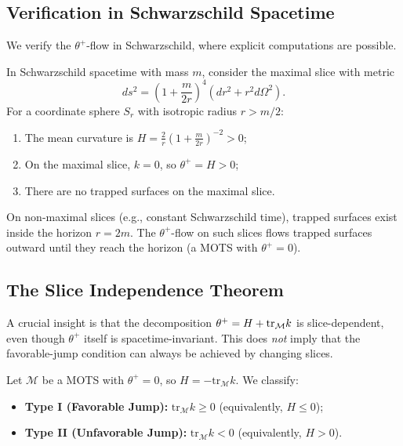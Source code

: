\subsection{Verification in Schwarzschild Spacetime}
\label{subsec:schwarzschild-verification}

We verify the $\theta^+$-flow in Schwarzschild, where explicit computations are possible.

\begin{proposition}
\label{prop:schwarzschild-flow}
In Schwarzschild spacetime with mass $m$, consider the maximal slice with metric
\begin{equation}
ds^2 = \left(1 + \frac{m}{2r}\right)^4 (dr^2 + r^2 d\Omega^2).
\end{equation}
For a coordinate sphere $S_r$ with isotropic radius $r > m/2$:
\begin{enumerate}
\item The mean curvature is $H = \frac{2}{r}\left(1 + \frac{m}{2r}\right)^{-2} > 0$;
\item On the maximal slice, $k = 0$, so $\theta^+ = H > 0$;
\item There are no trapped surfaces on the maximal slice.
\end{enumerate}
\end{proposition}

\begin{remark}
On non-maximal slices (e.g., constant Schwarzschild time), trapped surfaces exist inside the horizon $r = 2m$. The $\theta^+$-flow on such slices flows trapped surfaces outward until they reach the horizon (a MOTS with $\theta^+ = 0$).
\end{remark}

\subsection{The Slice Independence Theorem}
\label{subsec:slice-independence}

A crucial insight is that the decomposition $\theta^+ = H + \mathrm{tr}_{\mathcal{M}} k$ is slice-dependent, even though $\theta^+$ itself is spacetime-invariant. This does \emph{not} imply that the favorable-jump condition can always be achieved by changing slices.

\begin{definition}
\label{def:mots-types}
Let $\mathcal{M}$ be a MOTS with $\theta^+ = 0$, so $H = -\mathrm{tr}_{\mathcal{M}} k$. We classify:
\begin{itemize}
\item \textbf{Type I (Favorable Jump):} $\mathrm{tr}_{\mathcal{M}} k \geq 0$ (equivalently, $H \leq 0$);
\item \textbf{Type II (Unfavorable Jump):} $\mathrm{tr}_{\mathcal{M}} k < 0$ (equivalently, $H > 0$).
\end{itemize}
\end{definition}

